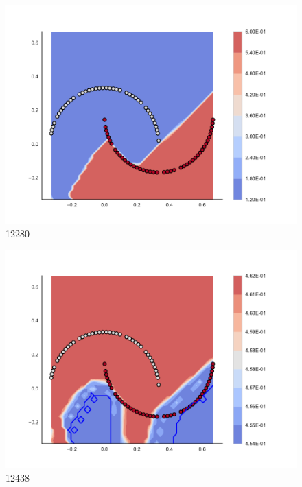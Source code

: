 \begin{subfigure}[b]{0.09\textwidth}
    \includegraphics[width=\textwidth]{img/convergence/12280.pdf}
    \caption{12280}
    \label{fig:convergence_12280}
\end{subfigure}
%
\begin{subfigure}[b]{0.09\textwidth}
    \includegraphics[width=\textwidth]{img/convergence/12438.pdf}
    \caption{12438}
    \label{fig:convergence_12438}
\end{subfigure}
%
